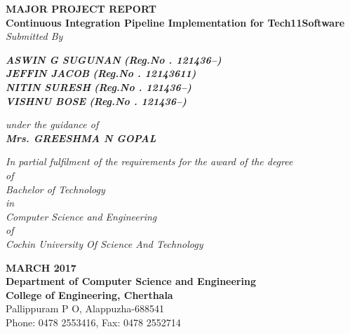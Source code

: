 \documentclass[12pt,a4paper,oneside]{report}
\begin{document}
\begin{titlepage}
\begin{center}

\large{\textbf{MAJOR PROJECT REPORT}}\\

\LARGE{\textbf{Continuous Integration Pipeline Implementation for Tech11Software}}\\

\Large{\textit{Submitted By }}\\
\begin{singlespace}
\Large{\textit{\textbf{ASWIN G SUGUNAN }\textbf{(Reg.No . 121436--)}}} \\
\Large{\textit{\textbf{JEFFIN JACOB  }\textbf{(Reg.No . 12143611)}}} \\
\Large{\textit{\textbf{NITIN SURESH }\textbf{(Reg.No . 121436--)}}} \\
\Large{\textit{\textbf{VISHNU BOSE }\textbf{(Reg.No . 121436--)}}} \\

\end{singlespace}
\Large{\textit{\textit{under the guidance of}}}\\
\Large{\textit{\textbf{Mrs. GREESHMA N GOPAL}}}\\
\begin{singlespace}
\small{\textit{In partial fulfilment of the requirements for the award of the degree}\\
\small{ \textit{of}}\\
\small{\textit{Bachelor of Technology} }\\
\small{\textit{in}}\\
\small{\textit{Computer Science and Engineering}}\\
\small{\textit{of}}\\
\small{\textit{Cochin University Of Science And Technology}}}\\
\end{singlespace}
\begin{singlespace}
\begin{figure}[h]
\begin{center}
\end{center}
\end{figure}
\end{singlespace}
\begin{singlespace}

\Large{{\textbf{MARCH 2017\\Department of Computer Science and Engineering\\College of Engineering, Cherthala}\\
Pallippuram P O, Alappuzha-688541 \\Phone: 0478 2553416, Fax: 0478 2552714}}
\end{singlespace}
\end{center}
\end{titlepage}
\end{document}

